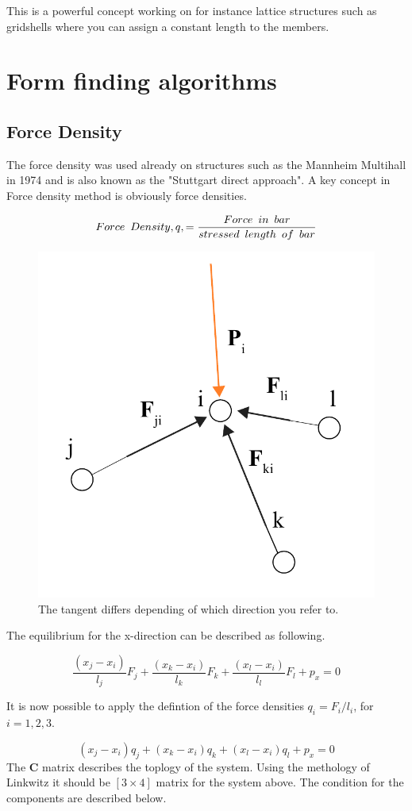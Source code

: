 This is a powerful concept working on for instance lattice structures such as gridshells where you can assign a constant length to the members.


\section{Form finding algorithms}

\subsection{Force Density}

The force density was used already on structures such as the Mannheim Multihall in 1974 and is also known as the "Stuttgart direct approach". A key concept in Force density method is obviously force densities.

$$ Force \enskip Density, q, = \frac{Force\enskip in \enskip bar}{stressed\enskip length\enskip of\enskip bar}$$

\begin{figure}[H]
\centering
\includegraphics[width=0.45\linewidth ]{figure/Theory/NodeEqFD.pdf}
\caption{The tangent differs depending of which direction you refer to. }
\end{figure}

The equilibrium for the x-direction can be described as following.

\begin{equation}
\frac{(x_j - x_i)}{l_j}F_j +\frac{(x_k - x_i)}{l_k}F_k+ \frac{(x_l - x_i)}{l_l}F_l + p_x = 0
\end{equation}

It is now possible to apply the defintion of the force densities $q_i = F_i/l_i$, for $i = 1,2,3$.

\begin{equation}
(x_j - x_i)q_j +(x_k - x_i)q_k + (x_l - x_i)q_l  + p_x = 0
\end{equation}
The \textbf{C} matrix describes the toplogy of the system. Using the methology of Linkwitz it should be $[3\times 4]$ matrix for the system above. The condition for the components are described below.

